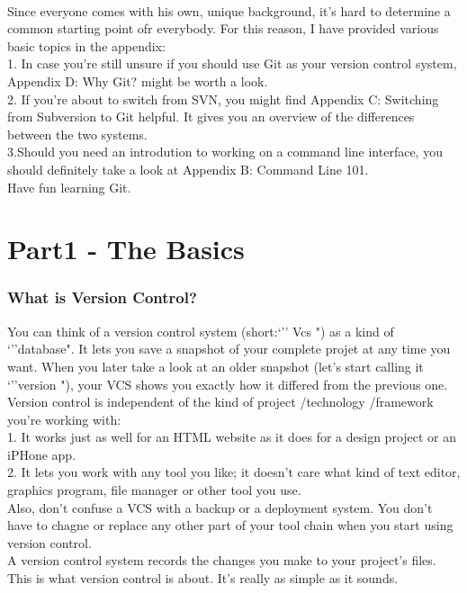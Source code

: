 \documentclass{book}
\begin{document}
	\paragraph{}
	Since everyone comes with his own, unique background, it's hard to determine a common starting point ofr everybody. For this reason, I have provided various basic topics in the appendix:\\
	1. In case you're still unsure if you should use Git as your version control system, Appendix D: Why Git? might be worth a look. \\
	2. If you're about to switch from SVN, you might find Appendix C: Switching from Subversion to Git helpful. It gives you an overview of the differences between the two systems.\\
	3.Should you need an introdution to working on a command line interface, you should definitely take a look at Appendix B: Command Line 101.\\
	Have fun learning Git.\\

\part{Part1 - The Basics}
\section{What is Version Control?}
You can think of a version control system (short:`'' Vcs ") as a kind of `''database". It lets you save a snapshot of your complete projet at any time you want. When you later take a look at an older snapshot (let's start calling it `''version "), your VCS shows you exactly how it differed from the previous one.\\
	Version control is independent of the kind of project /technology /framework you're working with:\\
	1. It works just as well for an HTML website as it does for a design project or an iPHone app.\\
	2. It lets you work with any tool you like; it doesn't care what kind of text editor, graphics program, file manager or other tool you use.\\
   Also, don't confuse a VCS with a backup or a deployment system. You don't have to chagne or replace any other part of your tool chain when you start using version control.\\
   A version control system records the changes you make to your project's files. This is what version control is about. It's really as simple as it sounds.\\
\end{document}
